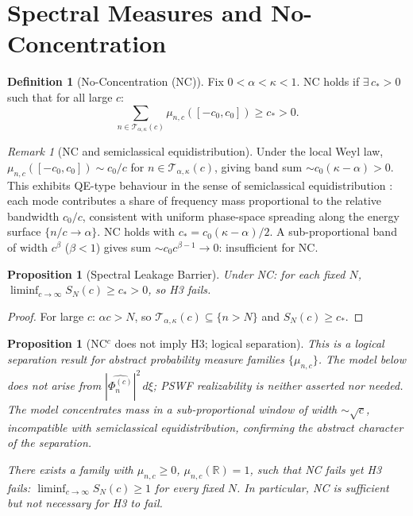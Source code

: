 \documentclass[12pt,a4paper]{amsart}
\newtheorem{proposition}[theorem]{Proposition}
\theoremstyle{definition}
\newtheorem{definition}[theorem]{Definition}
\theoremstyle{remark}
\newtheorem{remark}[theorem]{Remark}
\begin{document}
\section{Spectral Measures and No-Concentration}
\label{sec:NC}

\begin{definition}[No-Concentration (NC)]
\label{def:NC}
Fix $0<\alpha<\kappa<1$.
NC holds if $\exists\, c_*>0$ such that
for all large $c$:
\[
  \sum_{n\in\mathcal{T}_{\alpha,\kappa}(c)}
  \mu_{n,c}([-c_0,c_0]) \ge c_*>0.
\]
\end{definition}

\begin{remark}[NC and semiclassical equidistribution]
\label{rem:NC-QE}
Under the local Weyl law,
$\mu_{n,c}([-c_0,c_0])\sim c_0/c$
for $n\in\mathcal{T}_{\alpha,\kappa}(c)$,
giving band sum $\sim c_0(\kappa-\alpha)>0$.
This exhibits QE-type behaviour in the
sense of semiclassical equidistribution
\cite{Zworski2012}: each mode contributes
a share of frequency mass proportional to
the relative bandwidth $c_0/c$, consistent
with uniform phase-space spreading along
the energy surface $\{n/c\to\alpha\}$.
NC holds with $c_*=c_0(\kappa-\alpha)/2$.
A sub-proportional band of width $c^\beta$
($\beta<1$) gives sum
$\sim c_0 c^{\beta-1}\to 0$:
insufficient for NC.
\end{remark}

\begin{proposition}[Spectral Leakage Barrier]
\label{prop:barrier}
Under NC: for each fixed $N$,
$\liminf_{c\to\infty}S_N(c)\ge c_*>0$,
so H3 fails.
\end{proposition}
\begin{proof}
For large $c$: $\alpha c>N$,
so $\mathcal{T}_{\alpha,\kappa}(c)
\subseteq\{n>N\}$
and $S_N(c)\ge c_*$.
\end{proof}

\begin{proposition}[NC$^c$ does not imply H3;
  logical separation]
\label{prop:NC-not-H3}
\emph{This is a logical separation result
for abstract probability measure families
$\{\mu_{n,c}\}$.
The model below does not arise from
$|\widehat{\Phi_n^{(c)}}|^2\,d\xi$;
PSWF realizability is neither asserted
nor needed.
The model concentrates mass in a
sub-proportional window of width
$\sim\sqrt{c}$, incompatible with
semiclassical equidistribution, confirming
the abstract character of the separation.}

\medskip\noindent
There exists a family with
$\mu_{n,c}\ge 0$, $\mu_{n,c}(\mathbb{R})=1$,
such that NC fails yet H3 fails:
$\liminf_{c\to\infty}S_N(c)\ge 1$
for every fixed $N$.
In particular, NC is sufficient but not
necessary for H3 to fail.
\end{proposition}
\end{document}
